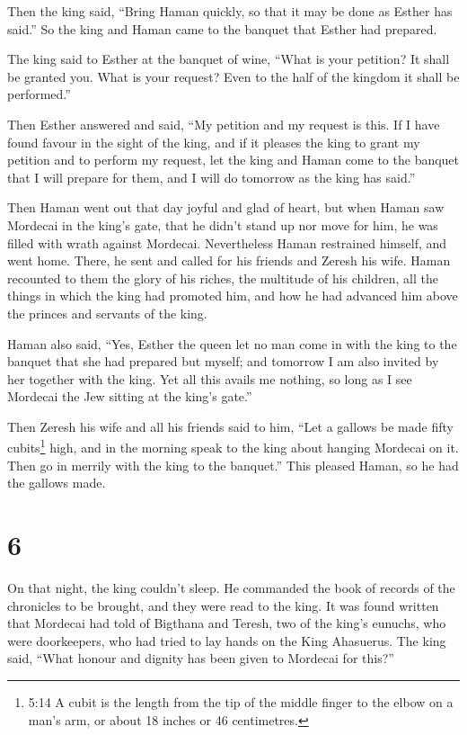  Then the king said, ``Bring Haman quickly, so that it may
be done as Esther has said.'' So the king and Haman came to the banquet
that Esther had prepared.

 The king said to Esther at the banquet of wine, ``What is
your petition? It shall be granted you. What is your request? Even to
the half of the kingdom it shall be performed.''

 Then Esther answered and said, ``My petition and my request
is this.  If I have found favour in the sight of the king,
and if it pleases the king to grant my petition and to perform my
request, let the king and Haman come to the banquet that I will prepare
for them, and I will do tomorrow as the king has said.''

 Then Haman went out that day joyful and glad of heart, but
when Haman saw Mordecai in the king's gate, that he didn't stand up nor
move for him, he was filled with wrath against Mordecai. 
Nevertheless Haman restrained himself, and went home. There, he sent and
called for his friends and Zeresh his wife.  Haman
recounted to them the glory of his riches, the multitude of his
children, all the things in which the king had promoted him, and how he
had advanced him above the princes and servants of the king.

 Haman also said, ``Yes, Esther the queen let no man come
in with the king to the banquet that she had prepared but myself; and
tomorrow I am also invited by her together with the king. 
Yet all this avails me nothing, so long as I see Mordecai the Jew
sitting at the king's gate.''

 Then Zeresh his wife and all his friends said to him,
``Let a gallows be made fifty cubits\footnote{5:14 A cubit is the length
  from the tip of the middle finger to the elbow on a man's arm, or
  about 18 inches or 46 centimetres.} high, and in the morning speak to
the king about hanging Mordecai on it. Then go in merrily with the king
to the banquet.'' This pleased Haman, so he had the gallows made.

\hypertarget{section-5}{%
\section{6}\label{section-5}}

 On that night, the king couldn't sleep. He commanded the
book of records of the chronicles to be brought, and they were read to
the king.  It was found written that Mordecai had told of
Bigthana and Teresh, two of the king's eunuchs, who were doorkeepers,
who had tried to lay hands on the King Ahasuerus.  The king
said, ``What honour and dignity has been given to Mordecai for this?''

